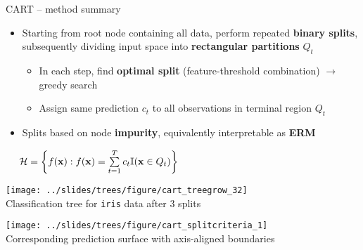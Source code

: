\begin{frame}{CART -- method summary}

\footnotesize

 
  

\medskip

\begin{itemize}
  \item Starting from root node containing all data, perform repeated 
  \textbf{binary splits}, subsequently dividing input space into
  \textbf{rectangular partitions} $Q_t$
  \begin{itemize}
    \item In each step, find \textbf{optimal split} (feature-threshold 
    combination) $\rightarrow$ greedy search
    \item Assign same prediction $c_t$ to all observations in terminal region 
    $Q_t$
  \end{itemize}
  \item Splits based on node \textbf{impurity}, equivalently interpretable as 
  \textbf{ERM}
\end{itemize}

\medskip
 
 ~~
$\mathcal{H} = \left\{ f(\mathbf{x}): f(\mathbf{x}) = \sum\limits_{t = 1}^T c_t \mathbb{I}(\mathbf{x} \in Q_t) 
\right\}$

\medskip

\begin{minipage}[b]{0.5\textwidth}
  \texttt{[image: ../slides/trees/figure/cart\_treegrow\_32]} \\
  \tiny{Classification tree for \texttt{iris} data after 3 splits}
\end{minipage}
\begin{minipage}[b]{0.49\textwidth}
  \centering
  \texttt{[image: 
  ../slides/trees/figure/cart\_splitcriteria\_1]} \\
  \tiny{Corresponding prediction surface with axis-aligned boundaries}
\end{minipage}%

\end{frame}


